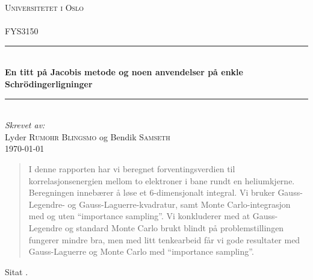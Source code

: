 \documentclass[11pt]{article}
\begin{document}
\begin{titlepage}
  \newcommand{\HRule}{\rule{\linewidth}{0.5mm}}
  \center
  \textsc{\LARGE Universitetet i Oslo}\\[1.5cm] %
  \textsc{\Large }\\[0.5cm] %
  \textsc{\large FYS3150}\\[0.5cm] %
  \HRule \\[0.4cm]
  { \huge \bfseries En titt på Jacobis metode og noen anvendelser på enkle Schr\"odingerligninger}\\[0.4cm] %
  \HRule \\[1.5cm]
  \Large \emph{Skrevet av:}\\
  Lyder \textsc{Rumohr Blingsmo} og Bendik \textsc{Samseth}\\[3cm]
  {\large \today}\\[3cm]
  \vfill
\end{titlepage}

\begin{abstract}
  I denne rapporten har vi beregnet forventingsverdien til korrelasjonsenergien
  mellom to elektroner i bane rundt en heliumkjerne. Beregningen
  innebærer å løse et 6-dimensjonalt integral. Vi bruker
  Gauss-Legendre- og Gauss-Laguerre-kvadratur, samt
  Monte Carlo-integrasjon med og uten ``importance sampling''. Vi
  konkluderer med at Gauss-Legendre og standard Monte Carlo brukt
  blindt på problemstillingen fungerer mindre bra, men med litt
  tenkearbeid får vi gode resultater med Gauss-Laguerre og Monte Carlo
  med ``importance sampling''.  
\end{abstract}

Sitat \cite{Lecture-notes}.

\printbibliography
\end{document}
